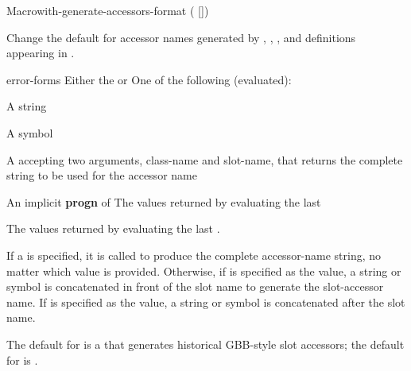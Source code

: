 \documentclass[10pt,twoside,english,pdftex]{article}
\begin{document}
\begin{functiondoc}{Macro}{with-generate-accessors-format}%
  {( [])
    \superstar{}
    \returns{} \superstar{}}

\fnsyntax

\fnpurpose Change the default for accessor names generated by
,
,
, and
 definitions appearing in
.

\fnpackage {}

\fnmodule {}

\fnargs
\begin{args}{error-forms}
\arg[format] Either the   or 
 One of the following (evaluated):
\begin{tightitemize}
\item A string 
\item A symbol
\item A  accepting two arguments, class-name and
  slot-name, that returns the complete string to be used for the accessor name
\end{tightitemize}
\arg[forms] An implicit \textbf{progn} of 
\arg[results] The values returned by evaluating the last 
\end{args}

\fnreturns The values returned by evaluating the last .

\fndescription If a  
is specified, it is called to produce the complete accessor-name string, no
matter which  value is provided.  Otherwise, if
 is specified as the  value, a string or
symbol  is concatenated in front of the slot
name to generate the slot-accessor name.  If  is
specified as the  value, a string or symbol
 is concatenated after the slot name.

The default  for  is a
 that generates historical GBB-style
 slot accessors; the
default for  is .


\end{functiondoc}
\end{document}
